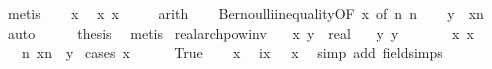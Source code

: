 \begin{isabellebody}
\ metis\isanewline
\ \ \isamarkupfalse%
\ x{}\ \isamarkupfalse%
\ x{}{}{\isacharcolon}{\kern0pt}\ {\isachardoublequoteopen}x{\isacharminus}{\kern0pt}\ {}\ {\isasymge}\ {\isacharminus}{\kern0pt}{}{\isachardoublequoteclose}\ \isamarkupfalse%
\ arith\isanewline
\ \ \isamarkupfalse%
\ Bernoulli{\isacharunderscore}{\kern0pt}inequality{\isacharbrackleft}{\kern0pt}OF\ x{}{}{\isacharcomma}{\kern0pt}\ of\ n{\isacharbrackright}{\kern0pt}\ n\isanewline
\ \ \isamarkupfalse%
\ {\isachardoublequoteopen}y\ {\isacharless}{\kern0pt}\ x{\isacharcircum}{\kern0pt}n{\isachardoublequoteclose}\ \isamarkupfalse%
\ auto\isanewline
\ \ \isamarkupfalse%
\ \isamarkupfalse%
\ {\isacharquery}{\kern0pt}thesis\ \isamarkupfalse%
\ metis\isanewline
{}\isamarkupfalse%
%
\endisatagproof
{\isafoldproof}%
%
\isadelimproof
\isanewline
%
\endisadelimproof
\isanewline
{}\isamarkupfalse%
\ real{\isacharunderscore}{\kern0pt}arch{\isacharunderscore}{\kern0pt}pow{\isacharunderscore}{\kern0pt}inv{\isacharcolon}{\kern0pt}\isanewline
\ \ \ x\ y\ {\isacharcolon}{\kern0pt}{\isacharcolon}{\kern0pt}\ real\isanewline
\ \ \ y{\isacharcolon}{\kern0pt}\ {\isachardoublequoteopen}y\ {\isachargreater}{\kern0pt}\ {}{\isachardoublequoteclose}\isanewline
\ \ \ \ \ x{}{\isacharcolon}{\kern0pt}\ {\isachardoublequoteopen}x\ {\isacharless}{\kern0pt}\ {}{\isachardoublequoteclose}\isanewline
\ \ \ {\isachardoublequoteopen}{\isasymexists}n{\isachardot}{\kern0pt}\ x{\isacharcircum}{\kern0pt}n\ {\isacharless}{\kern0pt}\ y{\isachardoublequoteclose}\isanewline
%
\isadelimproof
%
\endisadelimproof
%
\isatagproof
{}\isamarkupfalse%
\ {\isacharparenleft}{\kern0pt}cases\ {\isachardoublequoteopen}x\ {\isachargreater}{\kern0pt}\ {}{\isachardoublequoteclose}{\isacharparenright}{\kern0pt}\isanewline
\ \ \isamarkupfalse%
\ True\isanewline
\ \ \isamarkupfalse%
\ x{}\ \isamarkupfalse%
\ ix{\isacharcolon}{\kern0pt}\ {\isachardoublequoteopen}{}\ {\isacharless}{\kern0pt}\ {}{\isacharslash}{\kern0pt}x{\isachardoublequoteclose}\ \isamarkupfalse%
\ {\isacharparenleft}{\kern0pt}simp\ add{\isacharcolon}{\kern0pt}\ field{\isacharunderscore}{\kern0pt}simps{\isacharparenright}{\kern0pt}\isanewline

\end{isabellebody}
